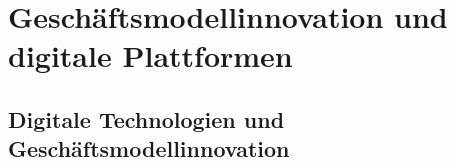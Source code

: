 \documentclass[12pt,a4paper]{article}
\begin{document}
\newpage
\section{Geschäftsmodellinnovation und digitale Plattformen}

\vspace*{0.5cm}
\subsection{Digitale Technologien und Geschäftsmodellinnovation} %
\end{document}
